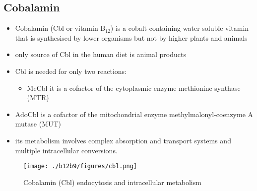 \documentclass{scrartcl}
\begin{document}
\subsection{Cobalamin}
\label{sec:org2f9c305}
\begin{itemize}
\item Cobalamin (Cbl or vitamin B\(_{\text{12}}\)) is a cobalt-containing
water-soluble vitamin that is synthesised by lower organisms but not
by higher plants and animals
\item only source of Cbl in the human diet is animal products
\item Cbl is needed for only two reactions:
\begin{itemize}
\item MeCbl it is a cofactor of the cytoplasmic enzyme methionine synthase (MTR)
\end{itemize}
\end{itemize}
\begin{itemize}
\item AdoCbl is a cofactor of the mitochondrial enzyme methylmalonyl-coenzyme A mutase (MUT)
\end{itemize}
\begin{itemize}
\item its metabolism involves complex absorption and transport systems and
multiple intracellular conversions.
\end{itemize}


\begin{figure}[htbp]
\centering
\texttt{[image: ./b12b9/figures/cbl.png]}
\caption{\label{fig:org37d6227}
Cobalamin (Cbl) endocytosis and intracellular metabolism}
\end{figure}
\end{document}
